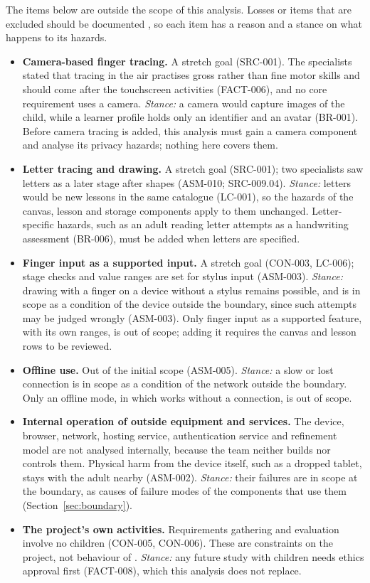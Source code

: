 \documentclass{article}
\begin{document}
The items below are outside the scope of this analysis. Losses or items that are
excluded should be documented \citep[p.~17]{LevesonAndThomas2018}, so each item
has a reason and a stance on what happens to its hazards.
\begin{itemize}
  \item \textbf{Camera-based finger tracing.} A stretch goal (SRC-001). The
  specialists stated that tracing in the air practises gross rather than fine
  motor skills and should come after the touchscreen activities (FACT-006), and
  no core requirement uses a camera. \emph{Stance:} a camera would capture
  images of the child, while a learner profile holds only an identifier and an
  avatar (BR-001). Before camera tracing is added, this
  analysis must gain a camera component and analyse its privacy hazards; nothing
  here covers them.
  \item \textbf{Letter tracing and drawing.} A stretch goal (SRC-001); two
  specialists saw letters as a later stage after shapes (ASM-010; SRC-009.04).
  \emph{Stance:} letters would be new lessons in the same catalogue (LC-001), so
  the hazards of the canvas, lesson and storage components apply to them
  unchanged. Letter-specific hazards, such as an adult reading letter attempts
  as a handwriting assessment (BR-006), must be added when letters are
  specified.
  \item \textbf{Finger input as a supported input.} A stretch goal (CON-003,
  LC-006); stage checks and value ranges are set for stylus input (ASM-003).
  \emph{Stance:} drawing with a finger on a device without a stylus remains
  possible, and is in scope as a condition of the device outside the boundary,
  since such attempts may be judged wrongly (ASM-003). Only finger input as a
  supported feature, with its own ranges, is out of scope; adding it requires
  the canvas and lesson rows to be reviewed.
  \item \textbf{Offline use.} Out of the initial scope (ASM-005). \emph{Stance:}
  a slow or lost connection is in scope as a condition of the network outside
  the boundary. Only an offline mode, in which \progname{} works without a
  connection, is out of scope.
  \item \textbf{Internal operation of outside equipment and services.} The
  device, browser, network, hosting service, authentication service and
  refinement model are not analysed internally, because the team neither builds
  nor controls them. Physical harm from the device itself, such as a dropped
  tablet, stays with the adult nearby (ASM-002). \emph{Stance:} their failures
  are in scope at the boundary, as causes of failure modes of the components
  that use them (Section~\ref{sec:boundary}).
  \item \textbf{The project's own activities.} Requirements gathering and
  evaluation involve no children (CON-005, CON-006). These are constraints on
  the project, not behaviour of \progname{}. \emph{Stance:} any future study
  with children needs ethics approval first (FACT-008), which this analysis does
  not replace.
\end{itemize}
\end{document}
